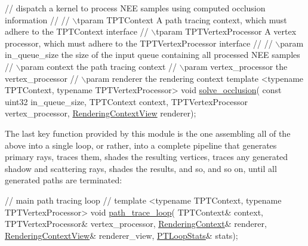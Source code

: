 \begin{DoxyCode}
\textcolor{comment}{// dispatch a kernel to process NEE samples using computed occlusion information}
\textcolor{comment}{//}
\textcolor{comment}{// \(\backslash\)tparam TPTContext           A path tracing context, which must adhere to the TPTContext interface}
\textcolor{comment}{// \(\backslash\)tparam TPTVertexProcessor   A vertex processor, which must adhere to the TPTVertexProcessor interface}
\textcolor{comment}{//}
\textcolor{comment}{// \(\backslash\)param in\_queue\_size         the size of the input queue containing all processed NEE samples}
\textcolor{comment}{// \(\backslash\)param context               the path tracing context}
\textcolor{comment}{// \(\backslash\)param vertex\_processor      the vertex\_processor}
\textcolor{comment}{// \(\backslash\)param renderer              the rendering context}
\textcolor{keyword}{template} <\textcolor{keyword}{typename} TPTContext, \textcolor{keyword}{typename} TPTVertexProcessor>
\textcolor{keywordtype}{void} \hyperlink{group___b_p_t_lib_core_ga588188b86e2afbe1f62d1bdd7a145cbf}{solve\_occlusion}(
    \textcolor{keyword}{const} uint32            in\_queue\_size,
    TPTContext              context,
    TPTVertexProcessor      vertex\_processor,
    \hyperlink{struct_rendering_context_view}{RenderingContextView}    renderer);
\end{DoxyCode}
 \label{_p_t_lib_page_path_trace_loop_anchor}%
%
\begin{DoxyParagraph}{}
The last key function provided by this module is the one assembling all of the above into a single loop, or rather, into a complete pipeline that generates primary rays, traces them, shades the resulting vertices, traces any generated shadow and scattering rays, shades the results, and so, and so on, until all generated paths are terminated\+:
\end{DoxyParagraph}

\begin{DoxyCode}
\textcolor{comment}{// main path tracing loop}
\textcolor{comment}{//}
\textcolor{keyword}{template} <\textcolor{keyword}{typename} TPTContext, \textcolor{keyword}{typename} TPTVertexProcessor>
\textcolor{keywordtype}{void} \hyperlink{group___p_t_lib_gadbd6e824e2ecdd07fae235bddebcd1d8}{path\_trace\_loop}(
    TPTContext&             context,
    TPTVertexProcessor&     vertex\_processor,
    \hyperlink{struct_rendering_context}{RenderingContext}&       renderer,
    \hyperlink{struct_rendering_context_view}{RenderingContextView}&   renderer\_view,
    \hyperlink{struct_p_t_loop_stats}{PTLoopStats}&            stats);
\end{DoxyCode}


